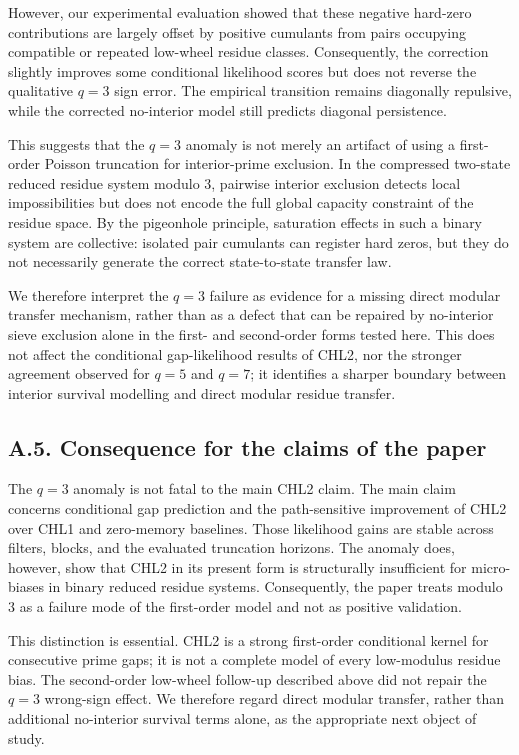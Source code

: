 \documentclass[10pt]{article}
\begin{document}
However, our experimental evaluation showed that these negative hard-zero contributions are largely offset by positive cumulants from pairs occupying compatible or repeated low-wheel residue classes. Consequently, the correction slightly improves some conditional likelihood scores but does not reverse the qualitative $q=3$ sign error. The empirical transition remains diagonally repulsive, while the corrected no-interior model still predicts diagonal persistence.

This suggests that the $q=3$ anomaly is not merely an artifact of using a first-order Poisson truncation for interior-prime exclusion. In the compressed two-state reduced residue system modulo $3$, pairwise interior exclusion detects local impossibilities but does not encode the full global capacity constraint of the residue space. By the pigeonhole principle, saturation effects in such a binary system are collective: isolated pair cumulants can register hard zeros, but they do not necessarily generate the correct state-to-state transfer law.

We therefore interpret the $q=3$ failure as evidence for a missing direct modular transfer mechanism, rather than as a defect that can be repaired by no-interior sieve exclusion alone in the first- and second-order forms tested here. This does not affect the conditional gap-likelihood results of CHL2, nor the stronger agreement observed for $q=5$ and $q=7$; it identifies a sharper boundary between interior survival modelling and direct modular residue transfer.

\subsection*{A.5. Consequence for the claims of the paper}

The $q=3$ anomaly is not fatal to the main CHL2 claim.  The main claim concerns conditional gap prediction and the path-sensitive improvement of CHL2 over CHL1 and zero-memory baselines.  Those likelihood gains are stable across filters, blocks, and the evaluated truncation horizons.  The anomaly does, however, show that CHL2 in its present form is structurally insufficient for micro-biases in binary reduced residue systems.  Consequently, the paper treats modulo $3$ as a failure mode of the first-order model and not as positive validation.

This distinction is essential.  CHL2 is a strong first-order conditional kernel for consecutive prime gaps; it is not a complete model of every low-modulus residue bias.  The second-order low-wheel follow-up described above did not repair the $q=3$ wrong-sign effect.  We therefore regard direct modular transfer, rather than additional no-interior survival terms alone, as the appropriate next object of study.
\end{document}

